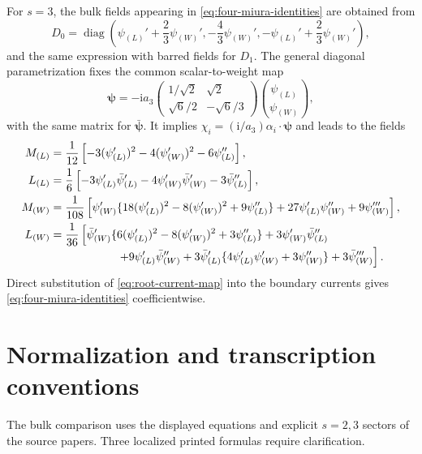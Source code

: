 \documentclass[11pt,a4paper]{article}
\numberwithin{equation}{section}
\theoremstyle{remark}
\newcommand{\ii}{\mathrm{i}}
\begin{document}
For $s=3$, the bulk fields appearing in \cref{eq:four-miura-identities} are
obtained from
\begin{equation}
 D_0=\operatorname{diag}\left(
 \psi_{(L)}'+\frac23\psi_{(W)}',
 -\frac43\psi_{(W)}',
 -\psi_{(L)}'+\frac23\psi_{(W)}'\right),
 \label{eq:bulk-D0}
\end{equation}
and the same expression with barred fields for $D_1$.  The general diagonal parametrization
fixes the common scalar-to-weight map
\begin{equation}
 \bm\psi=-\ii a_3
 \begin{pmatrix}
 1/\sqrt2&\sqrt2\\[1mm]
 \sqrt6/2&-\sqrt6/3
 \end{pmatrix}
 \binom{\psi_{(L)}}{\psi_{(W)}},
 \label{eq:scalar-weight-map}
\end{equation}
with the same matrix for $\bar{\bm\psi}$.  It implies
$\chi_i=(\ii/a_3)\alpha_i\cdot\bm\psi$ and leads to the fields
\begin{align}
 M_{(L)}={}&\frac1{12}\left[-3(\psi_{(L)}')^2-4(\psi_{(W)}')^2-6\psi_{(L)}''\right],
 \label{eq:bulk-ML}\\
 L_{(L)}={}&\frac16\left[-3\psi_{(L)}'\bar\psi_{(L)}'
 -4\psi_{(W)}'\bar\psi_{(W)}'-3\bar\psi_{(L)}''\right],
 \label{eq:bulk-LL}\\
 M_{(W)}={}&\frac1{108}\left[
 \psi_{(W)}'\{18(\psi_{(L)}')^2-8(\psi_{(W)}')^2+9\psi_{(L)}''\}
 +27\psi_{(L)}'\psi_{(W)}''+9\psi_{(W)}'''\right],
 \label{eq:bulk-MW}\\
 L_{(W)}={}&\frac1{36}\left[
 \bar\psi_{(W)}'\{6(\psi_{(L)}')^2-8(\psi_{(W)}')^2+3\psi_{(L)}''\}
 +3\psi_{(W)}'\bar\psi_{(L)}''
 \right.\nonumber\\[-1mm]
 &\hspace{16mm}\left.
 +9\psi_{(L)}'\bar\psi_{(W)}''
 +3\bar\psi_{(L)}'\{4\psi_{(L)}'\psi_{(W)}'+3\psi_{(W)}''\}
 +3\bar\psi_{(W)}'''\right].
 \label{eq:bulk-LW}
\end{align}
Direct substitution of \cref{eq:root-current-map} into the boundary currents gives
\cref{eq:four-miura-identities} coefficientwise.

\section{Normalization and transcription conventions}
\label{app:normalization-notes}

The bulk comparison uses the displayed equations and explicit $s=2,3$ sectors of the source
papers.  Three localized printed formulas require clarification.
\end{document}
